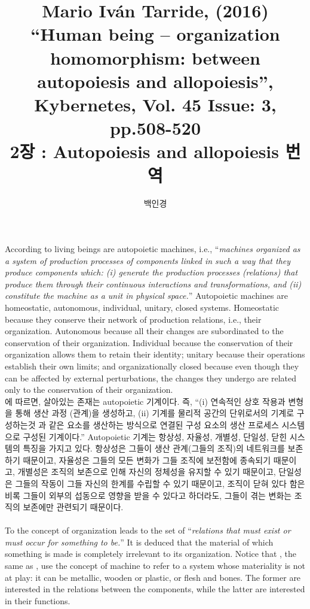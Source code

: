 \documentclass[11pt]{article} %
\title{Mario Iván Tarride, (2016) ``Human being – organization homomorphism: between autopoiesis and allopoiesis'', Kybernetes, Vol. 45 Issue: 3, pp.508-520\\2장 : Autopoiesis and allopoiesis 번역}
\author{백인경}
\begin{document}
\maketitle

According to \citet[p.69]{maturana1994maquinas} living beings are autopoietic machines, i.e., ``\textit{machines organized as a system of production processes of components linked in such a way that they produce components which: (i) generate the production processes (relations) that produce them through their continuous interactions and transformations, and (ii) constitute the machine as a unit in physical space.}'' Autopoietic machines are homeostatic, autonomous, individual, unitary, closed systems. Homeostatic because they conserve their network of production relations, i.e., their organization. Autonomous because all their changes are subordinated to the conservation of their organization. Individual because the conservation of their organization allows them to retain their identity; unitary because their operations establish their own limits; and organizationally closed because even though they can be affected by external perturbations, the changes they undergo are related only to the conservation of their organization\citep{maturana1994maquinas}.
\\
\citet[p.69]{maturana1994maquinas}에 따르면, 살아있는 존재는 autopoietic 기계이다. 즉, ``(i) 연속적인 상호 작용과 변형을 통해 생산 과정 (관계)을 생성하고, (ii) 기계를 물리적 공간의 단위로서의 기계로 구성하는것 과 같은 요소를 생산하는 방식으로 연결된 구성 요소의 생산 프로세스 시스템으로 구성된 기계이다.'' Autopoietic 기계는 항상성, 자율성, 개별성, 단일성, 닫힌 시스템의 특징을 가지고 있다. 항상성은 그들이 생산 관계(그들의 조직)의 네트워크를 보존하기 때문이고, 자율성은 그들의 모든 변화가 그들 조직에 보전함에 종속되기 때문이고, 개별성은 조직의 보존으로 인해 자신의 정체성을 유지할 수 있기 때문이고, 단일성은 그들의 작동이 그들 자신의 한계를 수립할 수 있기 때문이고, 조직이 닫혀 있다 함은 비록 그들이 외부의 섭동으로 영향을 받을 수 있다고 하더라도, 그들이 겪는 변화는 조직의 보존에만 관련되기 때문이다\citep{maturana1994maquinas}.
\\
\\
To \citet{maturana1994maquinas} the concept of organization leads to the set of ``\textit{relations that must exist or must occur for something to be.}'' It is deduced that the material of which something is made is completely irrelevant to its organization. Notice that \citet{maturana1994maquinas}, the same as \citet{ashby1972introduccion}, use the concept of machine to refer to a system whose materiality is not at play: it can be metallic, wooden or plastic, or flesh and bones. The former are interested in the relations between the components, while the latter are interested in their functions.
\end{document}

